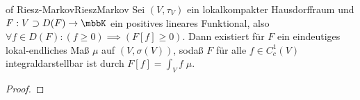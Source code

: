 \begin{msat}{of Riesz-Markov}{RieszMarkov}
    Sei $(V,\tau_V)$ ein lokalkompakter Hausdorffraum und $F:V\supset D(F)\to\mbbK$ ein positives lineares Funktional, also $\forall f\in D(F): (f\geq 0)\implies (F[f]\geq 0)$. Dann existiert für $F$ ein eindeutiges lokal-endliches Maß $\mu$ auf $(V,\sigma(V))$, sodaß $F$ für alle $f\in C_c^1(V)$ integraldarstellbar ist durch $F[f] = \int_V f\;\mu$. 
\end{msat}
\begin{proof}
                
\end{proof}